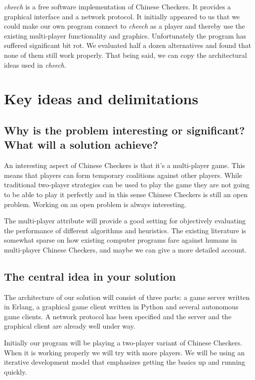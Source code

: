 \documentclass[a4paper,11pt]{article}
\begin{document}
\emph{cheech} is a free software implementation of Chinese Checkers.
It provides a graphical interface and a network protocol. It initially
appeared to us that we could make our own program connect to
\emph{cheech} as a player and thereby use the existing multi-player
functionality and graphics. Unfortunately the program has suffered
significant bit rot. We evaluated half a dozen alternatives and found
that none of them still work properly. That being said, we can copy
the architectural ideas used in \emph{cheech}.

\section{Key ideas and delimitations}
\subsection{Why is the problem interesting or significant?  What will a solution achieve?}

An interesting aspect of Chinese Checkers is that it's a multi-player
game. This means that players can form temporary coalitions against
other players. While traditional two-player strategies can be used to
play the game they are not going to be able to play it perfectly and
in this sense Chinese Checkers is still an open problem. Working on an
open problem is always interesting.

The multi-player attribute will provide a good setting for objectively
evaluating the performance of different algorithms and heuristics. The
existing literature is somewhat sparse on how existing computer
programs fare against humans in multi-player Chinese Checkers, and
maybe we can give a more detailed account.

\subsection{The central idea in your solution}

The architecture of our solution will consist of three parts: a game
server written in Erlang, a graphical game client written in Python
and several autonomous game clients. A network protocol has been
specified and the server and the graphical client are already well
under way.

Initially our program will be playing a two-player variant of Chinese
Checkers. When it is working properly we will try with more players.
We will be using an iterative development model that emphasizes
getting the basics up and running quickly.
\end{document}
